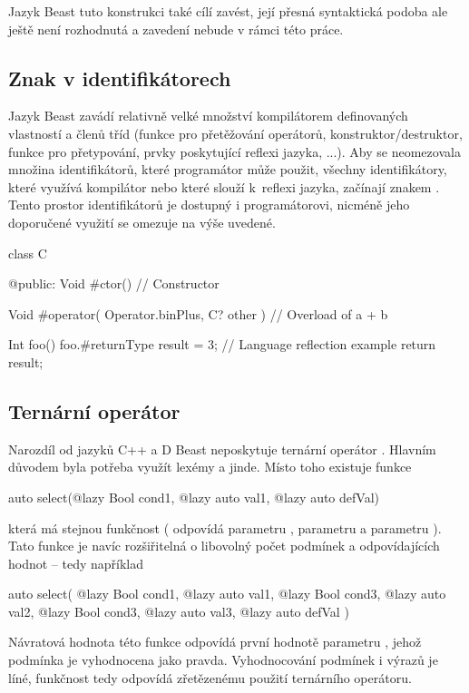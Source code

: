 Jazyk Beast tuto konstrukci také cílí zavést, její přesná syntaktická podoba ale ještě není rozhodnutá a zavedení nebude v rámci této práce.

\subsection{Znak \inlineCode{\#} v identifikátorech}
Jazyk Beast zavádí relativně velké množství kompilátorem definovaných vlastností a členů tříd (funkce pro přetěžování operátorů, konstruktor/destruktor, funkce pro přetypování, prvky poskytující reflexi jazyka, ...). Aby se neomezovala množina identifikátorů, které programátor může použit, všechny identifikátory, které využívá kompilátor nebo které slouží k~reflexi jazyka, začínají znakem \inlineCode{\#}. Tento prostor identifikátorů je dostupný i programátorovi, nicméně jeho doporučené využití se omezuje na výše uvedené.

\begin{code}
class C {

@public:
	Void #ctor() {
		// Constructor	
	}

	Void #operator( Operator.binPlus, C? other ) {
		// Overload of a + b
	}

	Int foo() {
		foo.#returnType	result = 3; // Language reflection example
		return result;
	}
	
}
\end{code}

\subsection{Ternární operátor} \label{ternary}
Narozdíl od jazyků C++ a D Beast neposkytuje ternární operátor . Hlavním důvodem byla potřeba využít lexémy  a \inlineDCode{:} jinde. Místo toho existuje funkce 
\begin{code}
auto select(@lazy Bool cond1, @lazy auto val1, @lazy auto defVal)
\end{code}
která má stejnou funkčnost ( odpovídá parametru ,  parametru  a  parametru ). Tato funkce je navíc rozšiřitelná o libovolný počet podmínek a odpovídajících hodnot -- tedy například 
\begin{code}
auto select(
	@lazy Bool cond1, @lazy auto val1,
	@lazy Bool cond3, @lazy auto val2,
	@lazy Bool cond3, @lazy auto val3,
	@lazy auto defVal
	)
\end{code}
Návratová hodnota této funkce odpovídá první hodnotě parametru , jehož podmínka  je vyhodnocena jako pravda. Vyhodnocování podmínek i výrazů je líné, funkčnost tedy odpovídá zřetězenému použití ternárního operátoru.

